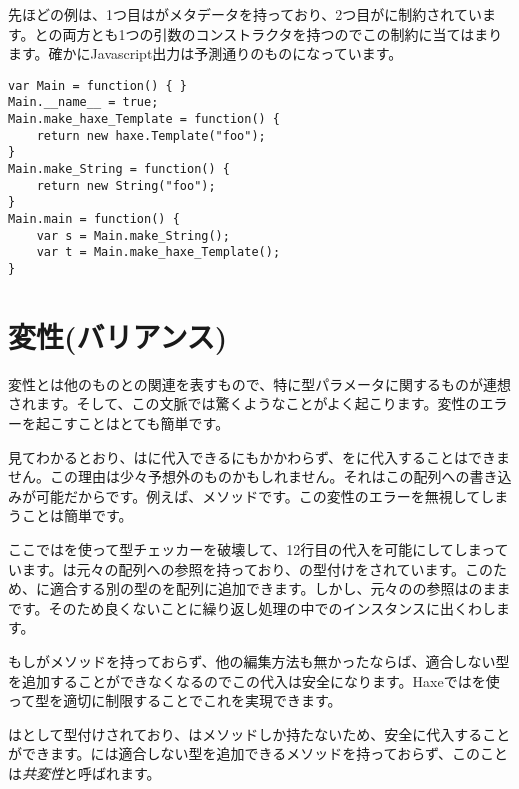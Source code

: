 先ほどの例は、1つ目はがメタデータを持っており、2つ目がに制約されています。との両方とも1つの引数のコンストラクタを持つのでこの制約に当てはまります。確かにJavascript出力は予測通りのものになっています。

\begin{lstlisting}
var Main = function() { }
Main.__name__ = true;
Main.make_haxe_Template = function() {
	return new haxe.Template("foo");
}
Main.make_String = function() {
	return new String("foo");
}
Main.main = function() {
	var s = Main.make_String();
	var t = Main.make_haxe_Template();
}
\end{lstlisting}

\section{変性(バリアンス)}
\label{type-system-variance}

変性とは他のものとの関連を表すもので、特に型パラメータに関するものが連想されます。そして、この文脈では驚くようなことがよく起こります。変性のエラーを起こすことはとても簡単です。


見てわかるとおり、はに代入できるにもかかわらず、をに代入することはできません。この理由は少々予想外のものかもしれません。それはこの配列への書き込みが可能だからです。例えば、メソッドです。この変性のエラーを無視してしまうことは簡単です。


ここではを使って型チェッカーを破壊して、12行目の代入を可能にしてしまっています。は元々の配列への参照を持っており、の型付けをされています。このため、に適合する別の型のを配列に追加できます。しかし、元々のの参照はのままです。そのため良くないことに繰り返し処理の中でのインスタンスに出くわします。

もしがメソッドを持っておらず、他の編集方法も無かったならば、適合しない型を追加することができなくなるのでこの代入は安全になります。Haxeではを使って型を適切に制限することでこれを実現できます。


はとして型付けされており、はメソッドしか持たないため、安全に代入することができます。には適合しない型を追加できるメソッドを持っておらず、このことは\emph{共変性}と呼ばれます。

